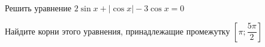 \begin{ex}
	\begin{condition}
		\begin{enumcols}[label=\asbuk*)]
			\item Решить уравнение \( 2\sin x + |\cos x| - 3\cos x=0 \)
			\item Найдите корни этого уравнения, принадлежащие промежутку \( \left[ \pi;\dfrac{5\pi}{2} \right] \)
		\end{enumcols}
	\end{condition}
\end{ex}
